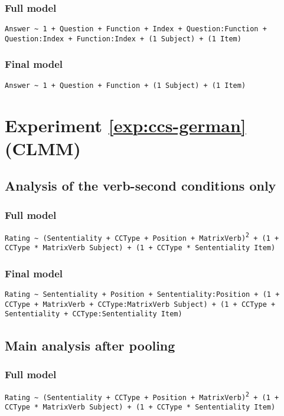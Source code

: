\subsubsection*{Full model}
\texttt{Answer \textasciitilde {} 1 + Question + Function + Index + Question:Function + Question:Index + Function:Index + (1  {}\textbar {} Subject) + (1  {}\textbar {} Item)}

\subsubsection*{Final model}
\texttt{Answer \textasciitilde {} 1 + Question + Function + (1  {}\textbar {} Subject) + (1  {}\textbar {} Item)}

\section*{Experiment \ref{exp:ccs-german} (CLMM)}
\subsection*{Analysis of the verb-second conditions only}
\subsubsection*{Full model}
\texttt{Rating \textasciitilde {} (Sententiality + CCType + Position + MatrixVerb)\textsuperscript{2} + (1 + CCType * MatrixVerb  {}\textbar {} Subject) + (1 + CCType * Sententiality  {}\textbar {} Item)}

\subsubsection*{Final model}
\texttt{Rating \textasciitilde {} Sententiality + Position + Sententiality:Position + (1 + CCType + MatrixVerb + CCType:MatrixVerb  {}\textbar {} Subject) + (1 + CCType + Sententiality + CCType:Sententiality  {}\textbar {} Item)}

\subsection*{Main analysis after pooling}
\subsubsection*{Full model}
\texttt{Rating \textasciitilde {} (Sententiality + CCType + Position + MatrixVerb)\textsuperscript{2} + (1 + CCType * MatrixVerb  {}\textbar {} Subject) + (1 + CCType * Sententiality  {}\textbar {} Item)}

